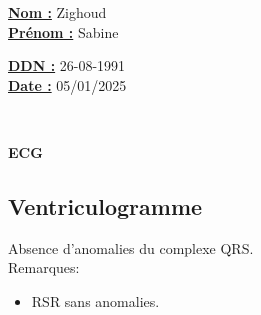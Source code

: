 \documentclass[12pt,a4paper]{article}%
\begin{document}
%
\normalsize%
\begin{minipage}{0.5\linewidth}%
\textbf{\underline{Nom :}} \hspace{1cm} Zighoud%
\\%
\textbf{\underline{Prénom :}} \hspace{1cm} Sabine%
\\%
\end{minipage}%
\begin{minipage}{0.5\linewidth}%
\textbf{\underline{DDN :}} \hspace{1cm} 26-08-1991%
\\%
\textbf{\underline{Date :}} \hspace{1cm} 05/01/2025%
\\%
\end{minipage}%
\hspace{\textwidth}%
\\%
\begin{center}%

        \begin{tcolorbox}[
            colframe=main_title_border_color,        %
            colback=main_title_background_color,        %
            coltitle=main_title_border_color,       %
            arc=8pt,              %
            boxrule=0.5mm,          %
            auto outer arc,       %
            width=\linewidth,     %
            halign=center         %
        ]
        \LARGE{\textbf{ECG}}
        \end{tcolorbox}
\end{center}%
%
\vspace*{\baselineskip}%
\subsection*{Ventriculogramme}%
\label{subsec:Ventriculogramme}%

%
Absence d’anomalies du complexe QRS.%
\\%
Remarques:%
\begin{itemize}%
\setlength{\itemsep}{0pt}%
\item%
RSR sans anomalies.%
\end{itemize}%
%
\vspace*{\baselineskip}%
\end{document}
